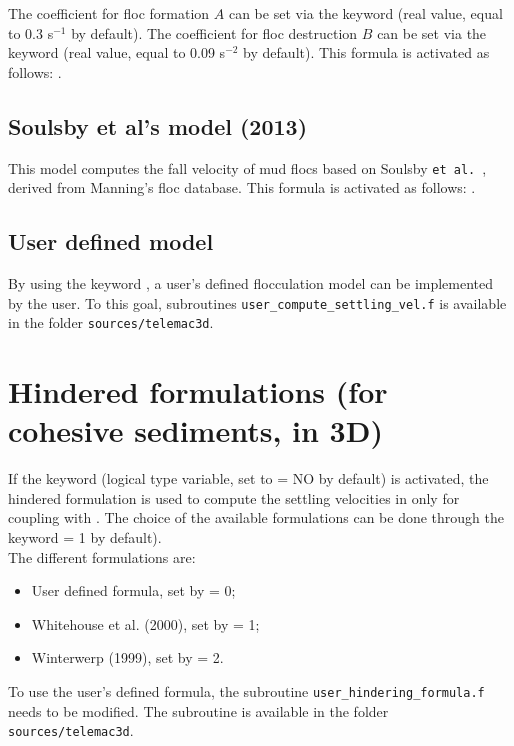 The coefficient for floc formation $A$ can be set via the keyword  (real value, equal to 0.3 s$^{-1}$ by default). The coefficient for floc destruction $B$ can be set via the keyword  (real value, equal to 0.09 s$^{-2}$ by default).
This formula is activated as follows: .
\subsection{Soulsby et al's model (2013)}
This model computes the fall velocity of mud flocs based on Soulsby \texttt{et al.}~\cite{SOULSBY20131}, derived from Manning's floc database.
This formula is activated as follows: .
\subsection{User defined model}
By using the keyword , a user's defined flocculation model can be implemented by the user. To this goal, subroutines \texttt{user\_compute\_settling\_vel.f} is available in the folder \texttt{sources/telemac3d}.

\section{Hindered formulations (for cohesive sediments, in 3D)}
If the keyword  (logical type variable, set to {\ttfamily = NO} by default) is activated, the hindered formulation is used to compute the settling velocities in \gaia only for coupling with . The choice of the available formulations can be done through the keyword  {\ttfamily = 1} by default). \\
The different formulations are:
\begin{itemize}
\item User defined formula, set by  {\ttfamily = 0};
\item Whitehouse et al. (2000), set by  {\ttfamily = 1};
\item Winterwerp (1999), set by  {\ttfamily = 2}.
\end{itemize}
To use the user's defined formula, the subroutine \texttt{user\_hindering\_formula.f} needs to be modified. The subroutine is available in the folder \texttt{sources/telemac3d}.

